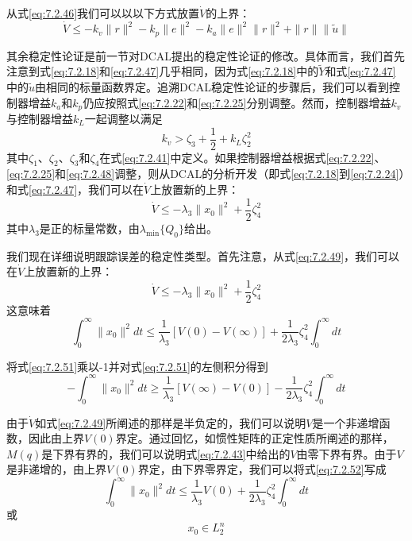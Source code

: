 \documentclass[UTF8]{ctexart}
\begin{document}
从式\eqref{eq:7.2.46}我们可以以以下方式放置$\dot{V}$的上界：
\begin{equation}\label{eq:7.2.47}
\dot{V} \leq -k_v \|r\|^2 - k_p \|e\|^2 - k_a\|e\|^2\|r\|^2 + \|r\|\|\tilde{u}\|
\end{equation}

其余稳定性论证是前一节对DCAL提出的稳定性论证的修改。具体而言，我们首先注意到式\eqref{eq:7.2.18}和\eqref{eq:7.2.47}几乎相同，因为式\eqref{eq:7.2.18}中的$\tilde{Y}$和式\eqref{eq:7.2.47}中的$\tilde{u}$由相同的标量函数界定。追溯DCAL稳定性论证的步骤后，我们可以看到控制器增益$k_a$和$k_p$仍应按照式\eqref{eq:7.2.22}和\eqref{eq:7.2.25}分别调整。然而，控制器增益$k_v$与控制器增益$k_L$一起调整以满足
\begin{equation}\label{eq:7.2.48}
k_v > \zeta_3 + \frac{1}{2} + k_L\zeta_2^2
\end{equation}
其中$\zeta_1$、$\zeta_2$、$\zeta_3$和$\zeta_4$在式\eqref{eq:7.2.41}中定义。如果控制器增益根据式\eqref{eq:7.2.22}、\eqref{eq:7.2.25}和\eqref{eq:7.2.48}调整，则从DCAL的分析开发（即式\eqref{eq:7.2.18}到\eqref{eq:7.2.24}）和式\eqref{eq:7.2.47}，我们可以在$\dot{V}$上放置新的上界：
\begin{equation}\label{eq:7.2.49}
\dot{V} \leq -\lambda_3\|x_0\|^2 + \frac{1}{2}\zeta_4^2
\end{equation}
其中$\lambda_3$是正的标量常数，由$\lambda_{\min}\{Q_0\}$给出。

我们现在详细说明跟踪误差的稳定性类型。首先注意，从式\eqref{eq:7.2.49}，我们可以在$\dot{V}$上放置新的上界：
\begin{equation}\label{eq:7.2.50}
\dot{V} \leq -\lambda_3\|x_0\|^2 + \frac{1}{2}\zeta_4^2
\end{equation}
这意味着
\begin{equation}\label{eq:7.2.51}
\int_0^{\infty} \|x_0\|^2 dt \leq \frac{1}{\lambda_3}[V(0) - V(\infty)] + \frac{1}{2\lambda_3}\zeta_4^2\int_0^{\infty} dt
\end{equation}

将式\eqref{eq:7.2.51}乘以-1并对式\eqref{eq:7.2.51}的左侧积分得到
\begin{equation}\label{eq:7.2.52}
-\int_0^{\infty} \|x_0\|^2 dt \geq \frac{1}{\lambda_3}[V(\infty) - V(0)] - \frac{1}{2\lambda_3}\zeta_4^2\int_0^{\infty} dt
\end{equation}

由于$\dot{V}$如式\eqref{eq:7.2.49}所阐述的那样是半负定的，我们可以说明$V$是一个非递增函数，因此由上界$V(0)$界定。通过回忆，如惯性矩阵的正定性质所阐述的那样，$M(q)$是下界有界的，我们可以说明式\eqref{eq:7.2.43}中给出的$V$由零下界有界。由于$V$是非递增的，由上界$V(0)$界定，由下界零界定，我们可以将式\eqref{eq:7.2.52}写成
\begin{equation}\label{eq:7.2.53}
\int_0^{\infty} \|x_0\|^2 dt \leq \frac{1}{\lambda_3}V(0) + \frac{1}{2\lambda_3}\zeta_4^2\int_0^{\infty} dt
\end{equation}
或
\begin{equation}\label{eq:7.2.54}
x_0 \in L_2^n
\end{equation}
\end{document}

